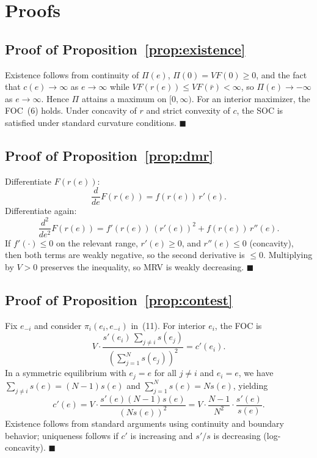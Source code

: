 \documentclass[AER]{AEA}
\newcommand{\qed}{\nolinebreak\hfill\ensuremath{\blacksquare}\par}
\DeclareRobustCommand{\AERlink}[1]{}
\begin{document}
\DeclareRobustCommand{\AERlink}[1]{\makebox[0pt][r]{\href{#1}{\color{blue}$\blacktriangleright$}\hspace{0.3em}}}




\appendix
\section{Proofs}

\subsection{Proof of Proposition~\ref{prop:existence}}

Existence follows from continuity of $\Pi(e)$, $\Pi(0) = VF(0) \geq 0$, and the fact
that $c(e) \to \infty$ as $e \to \infty$ while $VF(r(e)) \leq VF(\bar{r}) < \infty$, so
$\Pi(e) \to -\infty$ as $e \to \infty$. Hence $\Pi$ attains a maximum on $[0, \infty)$.
For an interior maximizer, the FOC~(6) holds. Under concavity of $r$ and strict convexity
of $c$, the SOC is satisfied under standard curvature conditions. \qed

\subsection{Proof of Proposition~\ref{prop:dmr}}

Differentiate $F(r(e))$:
\[
  \frac{d}{de} F(r(e)) = f(r(e))\, r'(e).
\]
Differentiate again:
\[
  \frac{d^2}{de^2} F(r(e)) = f'(r(e))\,(r'(e))^2 + f(r(e))\, r''(e).
\]
If $f'(\cdot) \leq 0$ on the relevant range, $r'(e) \geq 0$, and $r''(e) \leq 0$
(concavity), then both terms are weakly negative, so the second derivative is $\leq 0$.
Multiplying by $V > 0$ preserves the inequality, so MRV is weakly decreasing. \qed

\subsection{Proof of Proposition~\ref{prop:contest}}

Fix $e_{-i}$ and consider $\pi_i(e_i, e_{-i})$ in~(11). For interior $e_i$, the FOC is
\[
  V \cdot \frac{s'(e_i)\,\sum_{j \neq i} s(e_j)}{\left(\sum_{j=1}^N s(e_j)\right)^2}
  = c'(e_i).
\]
In a symmetric equilibrium with $e_j = e$ for all $j \neq i$ and $e_i = e$, we have
$\sum_{j \neq i} s(e) = (N-1)s(e)$ and $\sum_{j=1}^N s(e) = Ns(e)$, yielding
\[
  c'(e) = V \cdot \frac{s'(e)(N-1)s(e)}{(Ns(e))^2}
         = V \cdot \frac{N-1}{N^2} \cdot \frac{s'(e)}{s(e)}.
\]
Existence follows from standard arguments using continuity and boundary behavior;
uniqueness follows if $c'$ is increasing and $s'/s$ is decreasing (log-concavity). \qed
\end{document}
